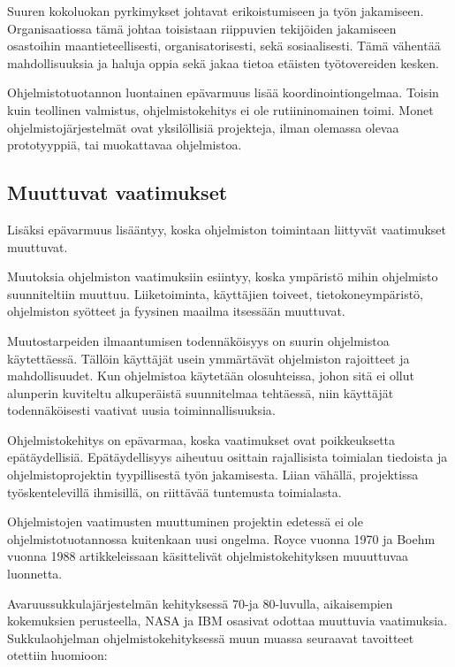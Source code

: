 \documentclass[finnish]{tktltiki2}
\theoremstyle{definition}
\theoremstyle{remark}
\begin{document}
Suuren kokoluokan pyrkimykset johtavat erikoistumiseen ja työn jakamiseen. Organisaatiossa tämä johtaa toisistaan riippuvien tekijöiden jakamiseen osastoihin maantieteellisesti, organisatorisesti, sekä sosiaalisesti. Tämä vähentää mahdollisuuksia ja haluja oppia sekä jakaa tietoa etäisten työtovereiden kesken\cite{KES95}.

Ohjelmistotuotannon luontainen epävarmuus lisää koordinointiongelmaa. Toisin kuin teollinen valmistus, ohjelmistokehitys ei ole rutiininomainen toimi. Monet ohjelmistojärjestelmät ovat yksilöllisiä projekteja, ilman olemassa olevaa prototyyppiä, tai muokattavaa ohjelmistoa\cite{KES95}.

\subsection{Muuttuvat vaatimukset}

Lisäksi epävarmuus lisääntyy, koska ohjelmiston toimintaan liittyvät vaatimukset muuttuvat\cite{KES95}.

Muutoksia ohjelmiston vaatimuksiin esiintyy, koska ympäristö mihin ohjelmisto suunniteltiin muuttuu. Liiketoiminta, käyttäjien toiveet, tietokoneympäristö, ohjelmiston syötteet ja fyysinen maailma itsessään muuttuvat\cite{KES95}.

Muutostarpeiden ilmaantumisen todennäköisyys on suurin ohjelmistoa käytettäessä. Tällöin käyttäjät usein ymmärtävät ohjelmiston rajoitteet ja mahdollisuudet. Kun ohjelmistoa käytetään olosuhteissa, johon sitä ei ollut alunperin kuviteltu alkuperäistä suunnitelmaa tehtäessä, niin käyttäjät todennäköisesti vaativat uusia toiminnallisuuksia\cite{KES95}.

Ohjelmistokehitys on epävarmaa, koska vaatimukset ovat poikkeuksetta epätäydellisiä. Epätäydellisyys aiheutuu osittain rajallisista toimialan tiedoista ja ohjelmistoprojektin tyypillisestä työn jakamisesta. Liian vähällä, projektissa työskentelevillä ihmisillä, on riittävää tuntemusta toimialasta\cite{KES95}.

Ohjelmistojen vaatimusten muuttuminen projektin edetessä ei ole ohjelmistotuotannossa kuitenkaan uusi ongelma. Royce vuonna 1970 ja Boehm vuonna 1988 artikkeleissaan\cite{ROY70}\cite{BOE88} käsittelivät ohjelmistokehityksen muuuttuvaa luonnetta. 

Avaruussukkulajärjestelmän kehityksessä 70-ja 80-luvulla, aikaisempien kokemuksien perusteella, NASA ja IBM osasivat odottaa muuttuvia vaatimuksia\cite{MWR84}. Sukkulaohjelman ohjelmistokehityksessä muun muassa seuraavat tavoitteet otettiin huomioon: 
\end{document}
